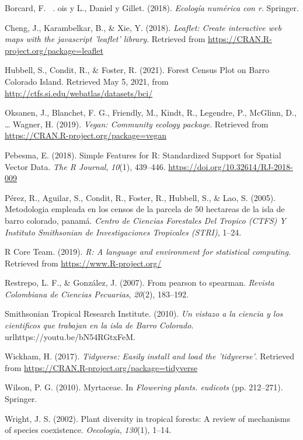 \documentclass[11pt,]{article}
\begin{document}
\hypertarget{ref-borcard2018numerical}{}
Borcard, F. ~. ois y L., Daniel y Gillet. (2018). \emph{Ecología
numérica con r}. Springer.

\hypertarget{ref-leaflet}{}
Cheng, J., Karambelkar, B., \& Xie, Y. (2018). \emph{Leaflet: Create
interactive web maps with the javascript 'leaflet' library}. Retrieved
from \url{https://CRAN.R-project.org/package=leaflet}

\hypertarget{ref-webcenso}{}
Hubbell, S., Condit, R., \& Foster, R. (2021). Forest Census Plot on
Barro Colorado Island. Retrieved May 5, 2021, from
\url{http://ctfs.si.edu/webatlas/datasets/bci/}

\hypertarget{ref-vegan}{}
Oksanen, J., Blanchet, F. G., Friendly, M., Kindt, R., Legendre, P.,
McGlinn, D., \ldots{} Wagner, H. (2019). \emph{Vegan: Community ecology
package}. Retrieved from \url{https://CRAN.R-project.org/package=vegan}

\hypertarget{ref-sf}{}
Pebesma, E. (2018). Simple Features for R: Standardized Support for
Spatial Vector Data. \emph{The R Journal}, \emph{10}(1), 439--446.
\url{https://doi.org/10.32614/RJ-2018-009}

\hypertarget{ref-perez2005metodologia}{}
Pérez, R., Aguilar, S., Condit, R., Foster, R., Hubbell, S., \& Lao, S.
(2005). Metodologia empleada en los censos de la parcela de 50 hectareas
de la isla de barro colorado, panamá. \emph{Centro de Ciencias
Forestales Del Tropico (CTFS) Y Instituto Smithsonian de Investigaciones
Tropicales (STRI)}, 1--24.

\hypertarget{ref-citadeR}{}
R Core Team. (2019). \emph{R: A language and environment for statistical
computing}. Retrieved from \url{https://www.R-project.org/}

\hypertarget{ref-restrepo2007pearson}{}
Restrepo, L. F., \& González, J. (2007). From pearson to spearman.
\emph{Revista Colombiana de Ciencias Pecuarias}, \emph{20}(2), 183--192.

\hypertarget{ref-bci_video}{}
Smithsonian Tropical Research Institute. (2010). \emph{Un vistazo a la
ciencia y los cientificos que trabajan en la isla de Barro Colorado}.
urlhttps://youtu.be/bN54RGtxFeM.

\hypertarget{ref-tidyverse}{}
Wickham, H. (2017). \emph{Tidyverse: Easily install and load the
'tidyverse'}. Retrieved from
\url{https://CRAN.R-project.org/package=tidyverse}

\hypertarget{ref-wilson2010myrtaceae}{}
Wilson, P. G. (2010). Myrtaceae. In \emph{Flowering plants. eudicots}
(pp. 212--271). Springer.

\hypertarget{ref-wright2002plant}{}
Wright, J. S. (2002). Plant diversity in tropical forests: A review of
mechanisms of species coexistence. \emph{Oecologia}, \emph{130}(1),
1--14.




\newpage
\singlespacing 
\end{document}
